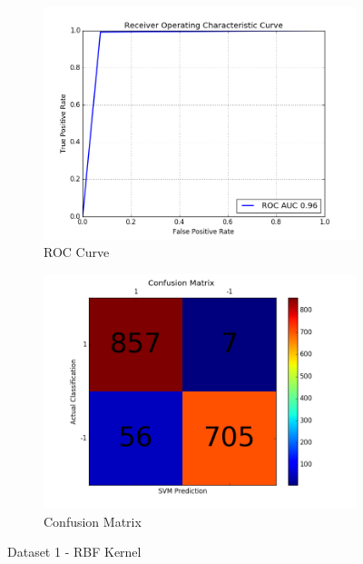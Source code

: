 \begin{figure}[h]
	
	\begin{subfigure}{0.5\textwidth}
		\includegraphics[width=0.9\linewidth]{images/AUC-Dataset1-rbf} 
		\caption{ROC Curve}
		\label{fig:AUC_Dataset1_rbf}
	\end{subfigure}
	\begin{subfigure}{0.5\textwidth}
		\includegraphics[width=0.9\linewidth]{images/CM-Dataset1-rbf}
		\caption{Confusion Matrix}
		\label{fig:CM_Dataset1_rbf}
	\end{subfigure}
	
	\caption{Dataset 1 - RBF Kernel}
	\label{fig:Dataset1_rbf_results}
\end{figure}


